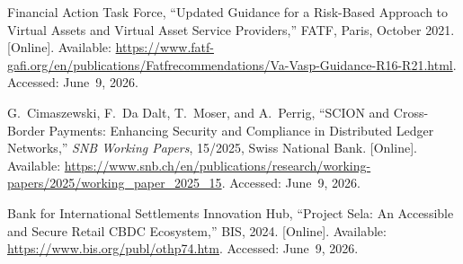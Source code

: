 \documentclass[12pt,a4paper]{report}
\begin{document}
{\begin{enumerate}[label={[\arabic*]}]
\item Financial Action Task Force, ``Updated Guidance for a Risk-Based Approach to Virtual Assets and Virtual Asset Service Providers,'' FATF, Paris, October 2021. [Online]. Available: \url{https://www.fatf-gafi.org/en/publications/Fatfrecommendations/Va-Vasp-Guidance-R16-R21.html}. Accessed: June~9, 2026.

\item G.~Cimaszewski, F.~Da Dalt, T.~Moser, and A.~Perrig, ``SCION and Cross-Border Payments: Enhancing Security and Compliance in Distributed Ledger Networks,'' \textit{SNB Working Papers}, 15/2025, Swiss National Bank. [Online]. Available: \url{https://www.snb.ch/en/publications/research/working-papers/2025/working_paper_2025_15}. Accessed: June~9, 2026.
\item Bank for International Settlements Innovation Hub, ``Project Sela: An Accessible and Secure Retail CBDC Ecosystem,'' BIS, 2024. [Online]. Available: \url{https://www.bis.org/publ/othp74.htm}. Accessed: June~9, 2026.

\end{enumerate}
}
\end{document}
